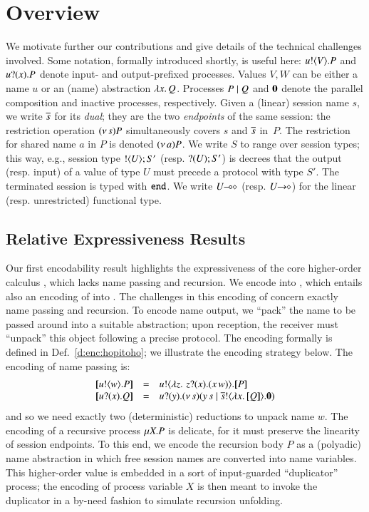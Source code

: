 \section{Overview}
\label{sec:overview}
\noi
We motivate further our contributions and 
give details of the technical challenges involved. 
Some  notation, formally introduced shortly, is useful here:
$u ! \langle V \rangle . P$
and
$u ? (x) . P$ denote input- and output-prefixed processes.
Values $V, W$ can be either a name $u$ or an (name) abstraction $\lambda x.\,Q$.
Processes $P \;|\; Q$ and $\mathbf{0}$ denote the parallel composition and inactive processes, respectively.
Given a (linear) session name $s$, we write $\overline{s}$ for its \emph{dual}; 
they are the two \emph{endpoints} of the same session: the restriction operation  
$(\nu\, s)P$ simultaneously covers $s$ and $\overline{s}$ in~$P$. 
The restriction for shared name $a$ in $P$ is denoted $(\nu\, a)P$.
We write $S$ to range over session types;
this way, e.g., session type $! \langle U \rangle ; S'$ (resp. $? (U) ; S'$) is
decrees that the output (resp. input) of a value of type $U$
must precede a protocol with type $S'$. 
The  terminated session is typed with $\mathtt{end}$.
We write $U\!\! \multimap\!\! \diamond$ (resp. $U\!\! \rightarrow\!\! \diamond$) for the 
linear (resp. unrestricted) functional type.

\subsection{Relative Expressiveness Results}
\label{subsec:intro:expr}
Our first encodability result highlights the expressiveness of 
the core higher-order calculus \HO, which lacks name passing and recursion. 
We encode \HOp into \HO, which entails also an encoding of \sessp into \HO.
The challenges in this encoding of concern exactly name passing and recursion.
To encode name output, we ``pack''
the name to be passed around into a suitable abstraction; 
upon reception, the receiver must ``unpack'' this object following a precise protocol.
The encoding formally is defined in Def.~\ref{d:enc:hopitoho}; we illustrate the encoding strategy below.
The encoding of name passing is:
\[
\begin{array}{rcll}
  \map{\bout{u}{w} P}	&=&	\bout{u}{ \abs{z}{\,\binp{z}{x} (\appl{x}{w})} } \map{P} \\
  \map{\binp{u}{x} Q}	&=&	\binp{u}{y} \newsp{s}{\appl{y}{s} \Par \bout{\dual{s}}{\abs{x}{\map{Q}}} \inact}
\end{array}
\]
and so we need 
exactly two (deterministic) reductions 
to unpack  name $w$.
The encoding of a recursive process $\mu X. P$  is delicate, for it 
 must preserve the linearity of session endpoints. To this end, we
encode the recursion body $P$ as a (polyadic) name abstraction
in which free session names are converted into name variables.
This higher-order value is embedded in a sort of input-guarded 
``duplicator'' process; the encoding of process variable $X$ is then meant to 
invoke the duplicator in a by-need fashion to simulate recursion unfolding. 

